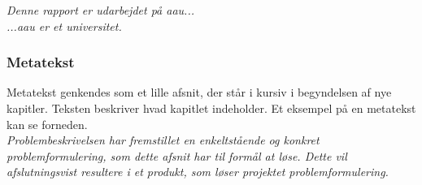 \noindent \textit{Denne rapport er udarbejdet på \gls{aau}... \\
\noindent ...\gls{aau} er et universitet. }

\subsubsection*{Metatekst}
Metatekst genkendes som et lille afsnit, der står i kursiv i begyndelsen af nye kapitler. Teksten beskriver hvad kapitlet indeholder. Et eksempel på en metatekst kan se forneden.\\

\noindent \textit{Problembeskrivelsen har fremstillet en enkeltstående og konkret problemformulering, som dette afsnit har til formål at løse. Dette vil afslutningsvist resultere i et produkt, som løser projektet problemformulering.}

